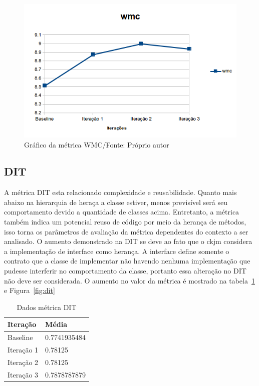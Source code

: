 \begin{figure}[h]
	\centering
	\includegraphics{img/wmc.png}
	\caption{Gráfico da métrica WMC/Fonte: Próprio autor} 
	\label{fig:wmc}
\end{figure}


\subsection{DIT}

A métrica DIT esta relacionado complexidade e reusabilidade. Quanto mais abaixo
na hierarquia de heraça a classe estiver, menos previsível será seu
comportamento devido a quantidade de classes acima. Entretanto, a métrica também
indica um potencial reuso de código por meio da herança de métodos, isso torna
os parâmetros de avaliação da métrica dependentes do contexto a ser analisado.
O aumento demonstrado na DIT se deve ao fato que o ckjm considera a
implementação de interface como herança. A interface define somente o contrato
que a classe de implementar não havendo nenhuma implementação que pudesse
interferir no comportamento da classe, portanto essa alteração no DIT não deve
ser considerada. O aumento no valor da métrica é mostrado na
tabela~\ref{tab:dit} e Figura~\ref{fig:dit}

\begin{table}[h]
	\centering
    \begin{tabular}{ | l | l | }
    \hline
    Iteração & Média 			\\ \hline
    Baseline & 0.7741935484  	\\ \hline
    Iteração 1 & 0.78125		\\ \hline
	Iteração 2 & 0.78125			\\ \hline
	Iteração 3 & 0.7878787879	\\ \hline
    \end{tabular}
    \caption{Dados métrica DIT}
    \label{tab:dit}
\end{table}

